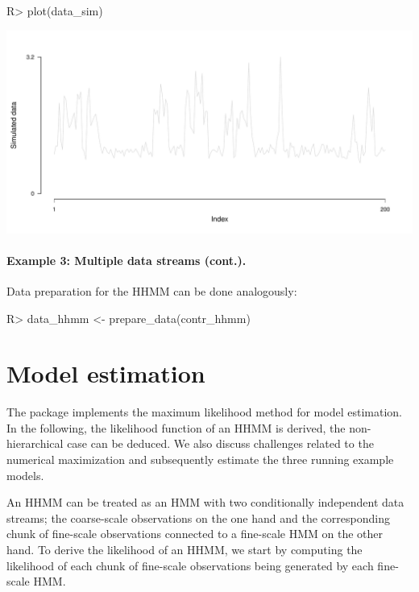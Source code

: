 \documentclass[article,shortnames]{jss}
\begin{document}
%
\begin{Schunk}
\begin{Sinput}
R> plot(data_sim)
\end{Sinput}
\end{Schunk}
\includegraphics{fhmm_oelschlaeger_adam_michels-sim-data-ts}
%

\paragraph{Example 3: Multiple data streams (cont.).} Data preparation for the HHMM can be done analogously:

%
\begin{Schunk}
\begin{Sinput}
R> data_hhmm <- prepare_data(contr_hhmm)
\end{Sinput}
\end{Schunk}
%

\section{Model estimation} \label{sec:model_estimation} %

The  package implements the maximum likelihood method for model estimation. In the following, the likelihood function of an HHMM is derived, the non-hierarchical case can be deduced. We also discuss challenges related to the numerical maximization and subsequently estimate the three running example models.

An HHMM can be treated as an HMM with two conditionally independent data streams; the coarse-scale observations on the one hand and the corresponding chunk of fine-scale observations connected to a fine-scale HMM on the other hand. To derive the likelihood of an HHMM, we start by computing the likelihood of each chunk of fine-scale observations being generated by each fine-scale HMM. 
\end{document}
